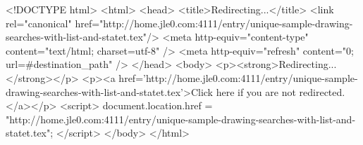 <!DOCTYPE html>
<html>
<head>
<title>Redirecting...</title>
<link rel="canonical" href="http://home.jle0.com:4111/entry/unique-sample-drawing-searches-with-list-and-statet.tex"/>
<meta http-equiv="content-type" content="text/html; charset=utf-8" />
<meta http-equiv="refresh" content="0; url=#{destination_path}" />
</head>
<body>
  <p><strong>Redirecting...</strong></p>
  <p><a href='http://home.jle0.com:4111/entry/unique-sample-drawing-searches-with-list-and-statet.tex'>Click here if you are not redirected.</a></p>
  <script>
    document.location.href = "http://home.jle0.com:4111/entry/unique-sample-drawing-searches-with-list-and-statet.tex";
  </script>
</body>
</html>
